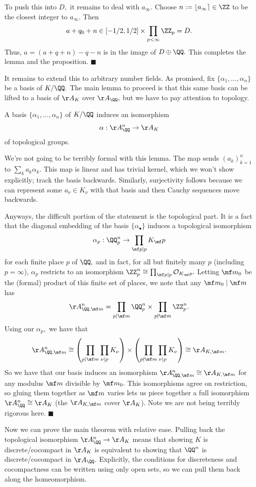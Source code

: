 To push this into $D,$ it remains to deal with $a_\infty.$ Choose $n:=\lfloor a_\infty\rceil\in\ZZ$ to be the closest integer to $a_\infty.$ Then
\[a+q_0+n\in[-1/2,1/2]\times\prod_{p<\infty}\ZZ_p=D.\]
Thus, $a=(a+q+n)-q-n$ is in the image of $D\oplus\QQ.$ This completes the lemma and the proposition. $\blacksquare$

It remains to extend this to arbitrary number fields. As promised, fix $\{\alpha_1,\ldots,\alpha_n\}$ be a basis of $K/\QQ.$ The main lemma to proceed is that this same basis can be lifted to a basis of $\AA_K$ over $\AA_\QQ,$ but we have to pay attention to topology.
\begin{lemma}
    A basis $\{\alpha_1,\ldots,\alpha_n\}$ of $K/\QQ$ induces an isomorphism
    \[\alpha:\AA_\QQ^n\to\AA_K\]
    of topological groups.
\end{lemma}
We're not going to be terribly formal with this lemma. The map sends $(a_k)_{k=1}^n$ to $\sum_ka_k\alpha_k.$ This map is linear and has trivial kernel, which we won't show explicitly; track the basis backwards. Similarly, surjectivity follows because we can represent some $a_\nu\in K_\nu$ with that basis and then Cauchy sequences move backwards.

Anyways, the difficult portion of the statement is the topological part. It is a fact that the diagonal embedding of the basis $\{\alpha_\bullet\}$ induces a topological isomorphism
\[\alpha_p:\QQ_p^n\to\prod_{\mf p\mid p}K_\mf p\]
for each finite place $p$ of $\QQ,$ and in fact, for all but finitely many $p$ (including $p=\infty$), $\alpha_p$ restricts to an isomorphism $\ZZ_p^n\cong\prod_{\mf p\mid p}\mathcal O_{K_\mf p}.$ Letting $\mf m_0$ be the (formal) product of this finite set of places, we note that any $\mf m_0\mid\mf m$ has
\[\AA_{\QQ,\mf m}^n=\prod_{p\mid\mf m}\QQ_p^n\times\prod_{p\nmid\mf m}\ZZ_p^n.\]
Using our $\alpha_p,$ we have that
\[\AA_{\QQ,\mf m}^n\cong\left(\prod_{p\mid\mf m}\prod_{\nu\mid p}K_\nu\right)\times\left(\prod_{p\nmid\mf m}\prod_{\nu\mid p}K_\nu\right)\cong\AA_{K,\mf m}.\]
So we have that our basis induces an isomorphism $\AA_{\QQ,\mf m}^n\cong\AA_{K,\mf m}$ for any modulus $\mf m$ divisible by $\mf m_0.$ This isomorphisms agree on restriction, so gluing them together as $\mf m$ varies lets us piece together a full isomorphism $\AA_\QQ^n\cong\AA_K$ (the $\AA_{K,\mf m}$ cover $\AA_K$). Note we are not being terribly rigorous here. $\blacksquare$

Now we can prove the main theorem with relative ease. Pulling back the topological isomorphism $\AA_\QQ^n\to\AA_K$ means that showing $K$ is discrete/cocompact in $\AA_K$ is equivalent to showing that $\QQ^n$ is discrete/cocompact in $\AA_\QQ.$ Explicitly, the conditions for discreteness and cocompactness can be written using only open sets, so we can pull them back along the homeomorphism.


